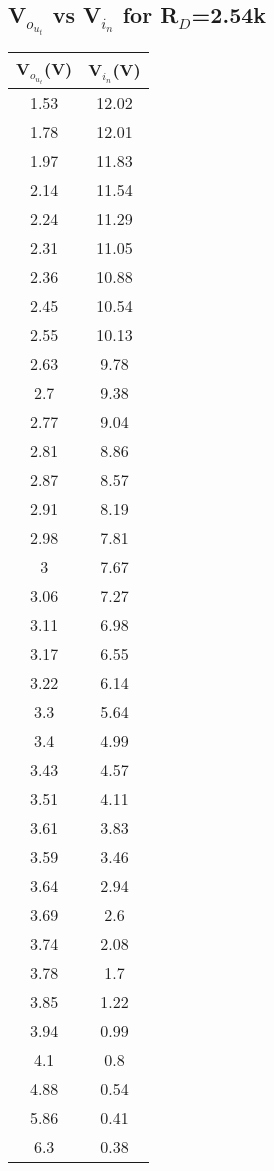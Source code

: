 \documentclass[12pt]{article}
\begin{document}
\subsection{ V$_o_u_t$ vs V$_i_n$ for R$_D$=2.54k\Omega}
\begin{center}
 \begin{tabular}{|| c | c||} 
 \hline
 V$_o_u_t$(V) &  V$_i_n$(V)\\ [0.5ex] 
 \hline\hline
 1.53 & 12.02 \\
\hline
1.78 & 12.01 \\
\hline
1.97 & 11.83 \\
\hline
2.14 & 11.54 \\
\hline
2.24 & 11.29 \\
\hline
2.31 & 11.05 \\
\hline
2.36 & 10.88 \\
\hline
2.45 & 10.54 \\
\hline
2.55 & 10.13 \\
\hline
2.63 & 9.78 \\
\hline
2.7 & 9.38 \\
\hline
2.77 & 9.04 \\
\hline
2.81 & 8.86 \\
\hline
2.87 & 8.57 \\
\hline
2.91 & 8.19 \\
\hline
2.98 & 7.81 \\
\hline
3 & 7.67 \\
\hline
3.06 & 7.27 \\
\hline
3.11 & 6.98 \\
\hline
3.17 & 6.55 \\
\hline
3.22 & 6.14 \\
\hline
3.3 & 5.64 \\
\hline
3.4 & 4.99 \\
\hline
3.43 & 4.57 \\
\hline
3.51 & 4.11 \\
\hline
3.61 & 3.83 \\
\hline
3.59 & 3.46 \\
\hline
3.64 & 2.94 \\
\hline
3.69 & 2.6 \\
\hline
3.74 & 2.08 \\
\hline
3.78 & 1.7 \\
\hline
3.85 & 1.22 \\
\hline
3.94 & 0.99 \\
\hline
4.1 & 0.8 \\
\hline
4.88 & 0.54 \\
\hline
5.86 & 0.41 \\
\hline
6.3 & 0.38 \\
\hline


\end{tabular}
\end{center}
\end{document}
